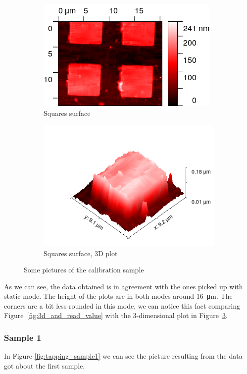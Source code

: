 \documentclass[11pt,a4paper]{article}
\begin{document}
\begin{figure}[H]
\begin{subfigure}[b]{0.45\textwidth}
\includegraphics[width=\textwidth]{tm_squares}
\caption{Squares surface}
\label{fig:}
\end{subfigure}
\begin{subfigure}[b]{0.45\textwidth}
\includegraphics[width=\textwidth]{tm_squares_3D}
\caption{Squares surface, 3D plot}
\label{fig:sm_border}
\end{subfigure}
\caption{Some pictures of the calibration sample}\label{fig:: tm cal}
\end{figure}
As we can see, the data obtained is in agreement with the ones picked up with static mode. The height of the plots are in both modes around \SI{16}{\micro\m}. The corners are a bit less rounded in this mode, we can notice this fact comparing Figure~\ref{fig:3d_and_read_value} with the 3-dimensional plot in Figure~\ref{fig:: tm cal}.

\subsubsection{Sample 1}
In Figure \ref{fig:tapping_sample1} we can see the picture resulting from the data got about the first sample.
\end{document}

